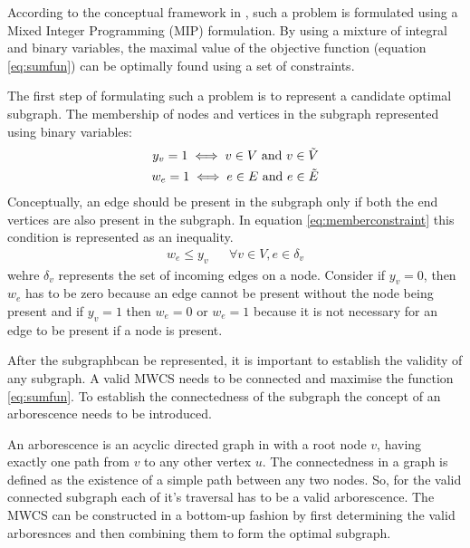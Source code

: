 \documentclass[msthesis.tex]{subfiles}
\begin{document}
According to the conceptual framework in \cite{DBLP:journals/corr/LobodaAS16}, such a problem is formulated using a Mixed Integer Programming (MIP) formulation. By using  a mixture of integral and binary variables, the maximal value of the objective function (equation \ref{eq:sumfun}) can be optimally found using a set of constraints.

The first step of formulating such a problem is to represent a candidate optimal subgraph. The membership of nodes and vertices in the subgraph represented using binary variables:
\begin{align}
    \label{eq:y_v}
    y_v = 1  \iff v \in V  \textrm{ and } v \in \Tilde{V} \\
    \label{eq:w_e}
    w_e =1  \iff e \in E  \textrm{  and }  e \in \Tilde{E}
\end{align}
Conceptually, an edge should be present in the subgraph only if both the end vertices are also present in the subgraph. In equation \ref{eq:memberconstraint} this condition is represented as an inequality.
\begin{align}
    \label{eq:memberconstraint}
    w_e \leq y_v && \forall v \in V, e \in \delta_{v}
\end{align}
wehre $\delta_{v}$ represents the set of incoming edges on a node. Consider if $y_v = 0$, then $w_e$ has to be zero because an edge cannot be present without the node being present and if $y_v = 1$ then $w_e = 0$ or $w_e = 1$ because it is not necessary for an edge to be present if a node is present.

After the subgraphbcan be represented, it is important to establish the validity of any subgraph. A valid MWCS needs to be connected and maximise the function \ref{eq:sumfun}. To establish the connectedness of the subgraph the concept of an arborescence needs to be introduced.

An arborescence is an acyclic directed graph in with a root node $v$, having exactly one path from $v$ to any other vertex $u$. The connectedness in a graph is defined as the existence of a simple path between any two nodes. So, for the valid connected subgraph each of it's traversal has to be a valid arborescence. The MWCS can be constructed in a bottom-up fashion by first determining the valid arboresnces and then combining them to form the optimal subgraph.
\end{document}
